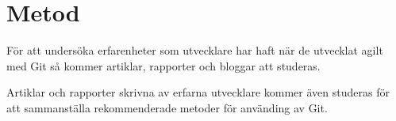 \section{Metod}
\label{sec:bjorn-method}

För att undersöka erfarenheter som utvecklare har haft när de utvecklat agilt med Git så kommer artiklar, rapporter och bloggar att studeras. 

Artiklar och rapporter skrivna av erfarna utvecklare kommer även studeras för att sammanställa rekommenderade metoder för använding av Git.